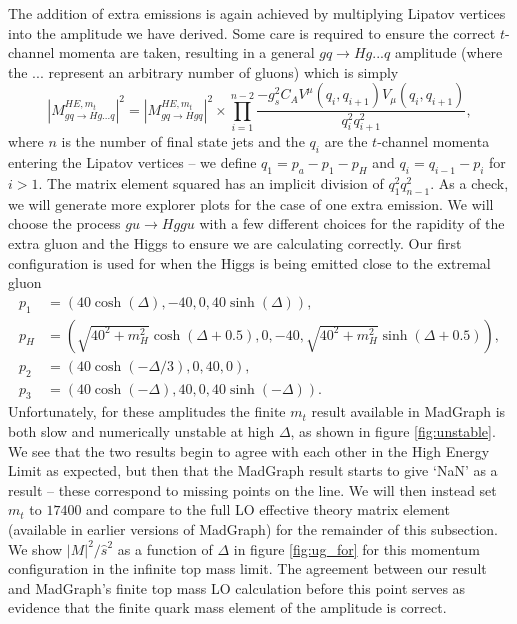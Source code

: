 The addition of extra emissions is again achieved by multiplying Lipatov vertices into the amplitude we have derived. Some care is required to ensure the correct $t$-channel momenta are taken, resulting in a general $gq\to Hg...q$ amplitude (where the ... represent an arbitrary number of gluons) which is simply
\begin{equation}
|M_{gq \to Hg...q}^{HE,m_t}|^2 = |M_{gq \to Hgq}^{HE,m_t}|^2 \times \prod_{i=1}^{n-2} \frac{-g_s^2C_A V^\mu(q_i, q_{i+1}) V_\mu(q_i, q_{i+1})}{q_i^2 q_{i+1}^2},
\end{equation}
where $n$ is the number of final state jets and the $q_i$ are the $t$-channel momenta entering the Lipatov vertices -- we define $q_1 = p_a - p_1 -p_H$ and $q_i = q_{i-1} - p_i$ for $i >1$. The matrix element squared has an implicit division of $q_1^2 q_{n-1}^2$. As a check, we will generate more explorer plots for the case of one extra emission. We will choose the process $gu \to Hggu$ with a few different choices for the rapidity of the extra gluon and the Higgs to ensure we are calculating correctly. Our first configuration is used for when the Higgs is being emitted close to the extremal gluon
\begin{subequations}
\begin{align}
p_1 &= (40 \cosh(\Delta),-40,0,40 \sinh(\Delta)), \\
p_H &= (\sqrt{40^2+m_H^2} \cosh(\Delta+0.5), 0,-40,\sqrt{40^2+m_H^2}  \sinh(\Delta+0.5)), \\
p_2 &= (40 \cosh(-\Delta/3),0,40,0), \\
p_3 &= (40 \cosh(-\Delta),40,0,40 \sinh(-\Delta)).
\end{align}
\end{subequations}
Unfortunately, for these amplitudes the finite $m_t$ result available in MadGraph is both slow and numerically unstable at high $\Delta$, as shown in figure \ref{fig:unstable}. We see that the two results begin to agree with each other in the High Energy Limit as expected, but then that the MadGraph result starts to give `NaN' as a result -- these correspond to missing points on the line. We will then instead set $m_t$ to $17400$ and compare to the full LO effective theory matrix element (available in earlier versions of MadGraph) for the remainder of this subsection. We show $|M|^2/\hat{s}^2$ as a function of $\Delta$ in figure \ref{fig:ug_for} for this momentum configuration in the infinite top mass limit. The agreement between our result and MadGraph's finite top mass LO calculation before this point serves as evidence that the finite quark mass element of the amplitude is correct.
